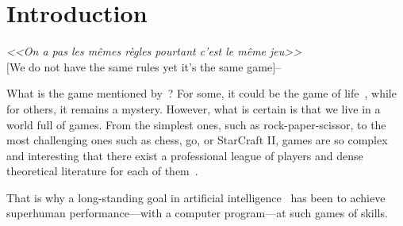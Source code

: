 






\renewcommand*\thesection{\arabic{section}}



\chapter{Introduction}

\begin{center}
\begin{minipage}{.9 \textwidth}
\centering
\emph{<<On a pas les mêmes règles pourtant c'est le même jeu>>}\\
$[$We do not have the same rules yet it’s the same game$]$--~\citet{lomepal2019mome}
\end{minipage}
\end{center} 

\vspace{5mm}




What is the game mentioned by~\citet{lomepal2019mome}? For some, it could be the game of life~\citep{gardner1970mathematical}, while for others, it remains a mystery. However, what is certain is that we live in a world full of games. From the simplest ones, such as rock-paper-scissor, to the most challenging ones such as chess, go, or StarCraft II, games are so complex and interesting that there exist a professional league of players and dense theoretical literature for each of them~\citep{simon1988skill,bozulich1992go,vinyals2017starcraft}. 


That is why a long-standing goal in artificial intelligence~\citep{samuel1959some,tesauro1995temporal,schaeffer2000games} has been to achieve superhuman performance---with a computer program---at such games of skills. 




